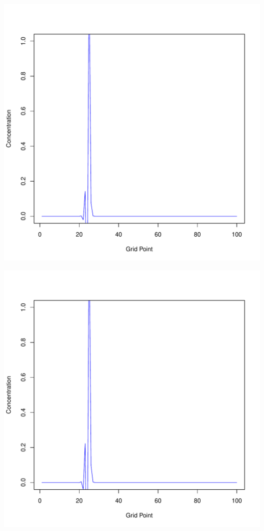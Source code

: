 \documentclass{tufte-handout}\usepackage[]{graphicx}\usepackage[]{xcolor}
\makeatletter
\def\maxwidth{ %
  \ifdim\Gin@nat@width>\linewidth
    \linewidth
  \else
    \Gin@nat@width
  \fi
}
\newenvironment{knitrout}{}{} %
\makeatother
\begin{document}
\begin{knitrout}
\includegraphics[width=\maxwidth]{figure/unnamed-chunk-1-5} 

\includegraphics[width=\maxwidth]{figure/unnamed-chunk-1-6} 


\end{knitrout}
\end{document}
